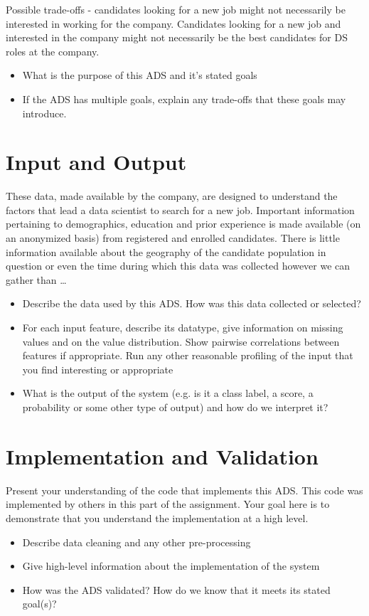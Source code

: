 \documentclass[11pt]{article}
\begin{document}
Possible trade-offs - candidates looking for a new job might not necessarily be interested in working for the company.  Candidates looking for a new job and interested in the company might not necessarily be the best candidates for DS roles at the company.

\begin{itemize}
\item What is the purpose of this ADS and it's stated goals
\item If the ADS has multiple goals, explain any trade-offs that these goals may introduce.
\end{itemize}


\pagebreak

\section{Input and Output}

These data, made available by the company, are designed to understand the factors that lead a data scientist to search for a new job.  Important information pertaining to demographics, education and prior experience is made available (on an anonymized basis) from registered and enrolled candidates.  There is little information available about the geography of the candidate population in question or even the time during which this data was collected however we can gather than \ldots

\begin{itemize}
	\item Describe the data used by this ADS.  How was this data collected or selected?
	\item For each input feature, describe its datatype, give information on missing values and on the value distribution. Show pairwise correlations between features if appropriate.  Run any other reasonable profiling of the input that you find interesting or appropriate
	\item What is the output of the system (e.g. is it a class label, a score, a probability or some other type of output) and how do we interpret it?
\end{itemize}

\pagebreak

\section{Implementation and Validation}
Present your understanding of the code that implements this ADS.  This code was implemented by others in this part of the assignment.  Your goal here is to demonstrate that you understand the implementation at a high level.
\begin{itemize}
\item Describe data cleaning and any other pre-processing
\item Give high-level information about the implementation of the system
\item How was the ADS validated?  How do we know that it meets its stated goal(s)?
\end{itemize}
\end{document}
